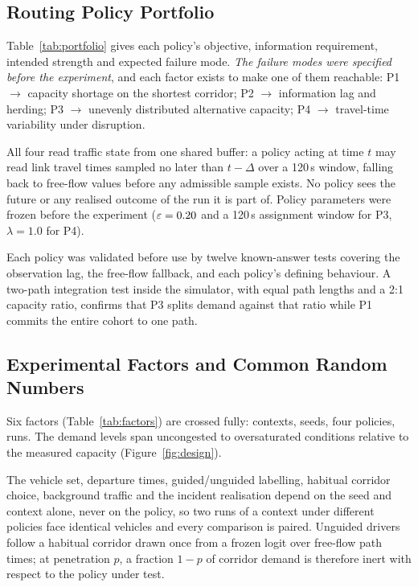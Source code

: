 \subsection{Routing Policy Portfolio}

Table~\ref{tab:portfolio} gives each policy's objective, information
requirement, intended strength and expected failure mode. \emph{The failure
modes were specified before the experiment}, and each factor exists to make one
of them reachable: P1 $\rightarrow$ capacity shortage on the shortest corridor;
P2 $\rightarrow$ information lag and herding; P3 $\rightarrow$ unevenly
distributed alternative capacity; P4 $\rightarrow$ travel-time variability under
disruption.

All four read traffic state from one shared buffer: a policy acting at time $t$
may read link travel times sampled no later than $t-\Delta$ over a 120\,s
window, falling back to free-flow values before any admissible sample exists. No
policy sees the future or any realised outcome of the run it is part of. Policy
parameters were frozen before the experiment ($\varepsilon=0.20$ and a
120\,s assignment window for P3, $\lambda=1.0$ for P4).

Each policy was validated before use by twelve known-answer tests covering the
observation lag, the free-flow fallback, and each policy's defining behaviour.
A two-path integration test inside the simulator, with equal path lengths and a
2:1 capacity ratio, confirms that P3 splits demand \NumTwoPathRatio{} against
that ratio while P1 commits the entire cohort to one path.



\subsection{Experimental Factors and Common Random Numbers}
\label{sec:factors}

Six factors (Table~\ref{tab:factors}) are crossed fully: \NumContexts{}
contexts, \NumSeeds{} seeds, four policies, \NumRunsMain{} runs. The demand
levels span uncongested to oversaturated conditions relative to the measured
capacity (Figure~\ref{fig:design}).

The vehicle set, departure times, guided/unguided labelling, habitual corridor
choice, background traffic and the incident realisation depend on the seed and
context alone, never on the policy, so two runs of a context under different
policies face identical vehicles and every comparison is paired. Unguided
drivers follow a habitual corridor drawn once from a frozen logit over free-flow
path times; at penetration $p$, a fraction $1-p$ of corridor demand is therefore
inert with respect to the policy under test.

